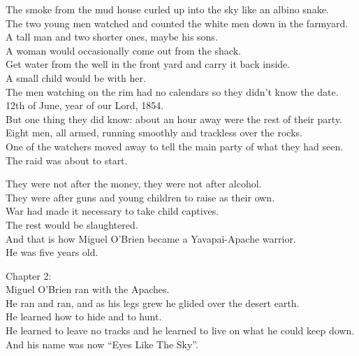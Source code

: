 The smoke from the mud house curled up into the sky like an albino snake. \\
The two young men watched and counted the white men down in the farmyard. \\
A tall man and two shorter ones, maybe his sons. \\
A woman would occasionally come out from the shack. \\
Get water from the well in the front yard and carry it back inside. \\
A small child would be with her. \\
The men watching on the rim had no calendars so they didn't know the date. \\
12th of June, year of our Lord, 1854. \\

But one thing they did know: about an hour away were the rest of their party. \\
Eight men, all armed, running smoothly and trackless over the rocks. \\
One of the watchers moved away to tell the main party of what they had seen. \\

The raid was about to start. \\




They were not after the money, they were not after alcohol. \\
They were after guns and young children to raise as their own. \\
War had made it necessary to take child captives. \\
The rest would be slaughtered. \\
And that is how Miguel O'Brien became a Yavapai-Apache warrior. \\
He was five years old. \\




Chapter 2: \\

Miguel O'Brien ran with the Apaches. \\
He ran and ran, and as his legs grew he glided over the desert earth. \\
He learned how to hide and to hunt. \\
He learned to leave no tracks and he learned to live on what he could keep down. \\
And his name was now ``Eyes Like The Sky''. \\

